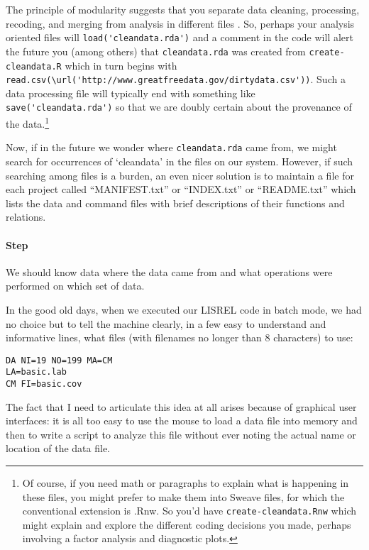 \documentclass[12pt]{article}
\begin{document}
The principle of modularity suggests that you separate data cleaning,
processing, recoding, and merging from analysis in different files
\citep{nagler1995coding}. So, perhaps your analysis oriented files
will \Verb+load('cleandata.rda')+ and a comment in the code will alert
the future you (among others) that \Verb+cleandata.rda+ was created
from \Verb+create-cleandata.R+ which in turn begins with
\Verb+read.csv(\url('http://www.greatfreedata.gov/dirtydata.csv'))+. Such
a data processing file will typically end with something like
\Verb+save('cleandata.rda')+ so that we are doubly certain about the
provenance of the data.\footnote{Of course, if you need math or
  paragraphs to explain what is happening in these files, you might
  prefer to make them into Sweave files, for which the conventional
  extension is .Rnw. So you'd have \Verb+create-cleandata.Rnw+ which
  might explain and explore the different coding decisions you made,
  perhaps involving a factor analysis and diagnostic plots.}

Now, if in the future we wonder where \Verb+cleandata.rda+ came from, we
might search for occurrences of `cleandata' in the files on our
system. However, if such searching among files is a burden, an even
nicer solution is to maintain a file for each project called
``MANIFEST.txt'' or ``INDEX.txt'' or ``README.txt'' which lists the
data and command files with brief descriptions of their functions and
relations.

\paragraph{Step \thesection} We should know data where the data came
from and what operations were performed on which set of data.

In the good old days, when we executed our LISREL code in batch mode,
we had no choice but to tell the machine clearly, in a few easy to
understand and informative lines, what files (with filenames no longer
than 8 characters) to use:

\begin{Verbatim}[fontsize=\footnotesize]
DA NI=19 NO=199 MA=CM
LA=basic.lab
CM FI=basic.cov
\end{Verbatim}

The fact that I need to articulate this idea at all arises because of
graphical user interfaces: it is all too easy to use the mouse to load
a data file into memory and then to write a script to analyze this
file without ever noting the actual name or location of the data file.
\end{document}
